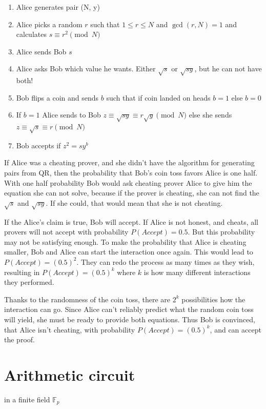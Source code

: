 \begin{enumerate}
    \item Alice generates pair (N, y)
    \item Alice picks a random $r$ such that $1 \leq r \leq N$ and $\gcd(r, N) = 1$
          and calculates $s \equiv r^2 \pmod{N}$
    \item Alice sends Bob $s$
    \item Alice asks Bob which value he wants. Either $\sqrt{s}$ or $\sqrt{sy}$, but he can not have both!
    \item Bob flips a coin and sends $b$ such that if coin landed on heads $b = 1$ else $b = 0$
    \item If $b = 1$ Alice sends to Bob $z \equiv \sqrt{sy} \equiv r \sqrt{y} \pmod{N}$ else she sends $z \equiv \sqrt{s} \equiv r \pmod{N}$
    \item Bob accepts if $z^2 = sy^b$
\end{enumerate}

If Alice was a cheating prover, and she didn't have the algorithm for
generating pairs from QR, then the probability that Bob's coin toss favors
Alice is one half. With one half probability Bob would ask cheating prover
Alice to give him the equation she can not solve, because if the prover is
cheating, she can not find the $\sqrt{s}$ and $\sqrt{sy}$. If she could,
that would mean that she is not cheating.

If the Alice's claim is true, Bob will accept. If Alice is not honest, and
cheats, all provers will not accept with probability $P(Accept) = 0.5$.
But this probability may not be satisfying enough. To make the probability
that Alice is cheating smaller, Bob and Alice can start the interaction once
again. This would lead to $P(Accept) = (0.5)^2$. They can redo the process
as many times as they wish, resulting in $P(Accept) = (0.5)^k$ where $k$
is how many different interactions they performed.

Thanks to the randomness of the coin toss, there are $2^k$ possibilities how
the interaction can go. Since Alice can't reliably predict what the random
coin toss will yield, she must be ready to provide both equations. Thus Bob is
convinced, that Alice isn't cheating, with probability $P(Accept) = (0.5)^k$,
and can accept the proof.

\section{Arithmetic circuit}
in a finite field $\mathbb{F}_p$




